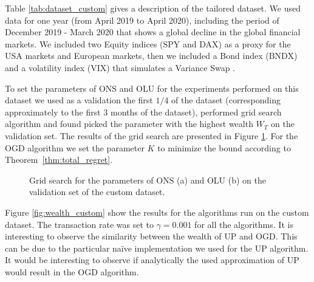 Table \ref{tab:dataset_custom} gives a description of the tailored dataset. We used data for one year (from April 2019 to April 2020), including the period of December 2019 - March 2020 that shows a global decline in the global financial markets. We included two Equity indices (SPY and DAX) as a proxy for the USA markets and European markets, then we included a Bond index (BNDX) and a volatility index (VIX) that simulates a Variance Swap \cite{bossu2006introduction}.

To set the parameters of ONS and OLU for the experiments performed on this dataset we used as a validation the first $1/4$ of the dataset (corresponding approximately to the first $3$ months of the dataset), performed  grid search algorithm and found picked the parameter with the highest wealth $W_T$ on the validation set. The results of the grid search are presented in Figure \ref{fig:grid}. For the OGD algorithm we set the parameter $K$ to minimize the bound according to Theorem~\ref{thm:total_regret}.

\begin{figure}[ht!]
    \centering
\caption{Grid search for the parameters of ONS (a) and OLU (b) on the validation set of the custom dataset.} \label{fig:grid}
\end{figure}

Figure \ref{fig:wealth_custom} show the results for the algorithms run on the custom dataset. The transaction rate was set to $\gamma=0.001$ for all the algorithms. It is interesting to observe the similarity between the wealth of UP and OGD. This can be due to the particular na\"ive implementation we used for the UP algorithm. It would be interesting to observe if analytically the used  approximation of UP would result in the OGD algorithm.

